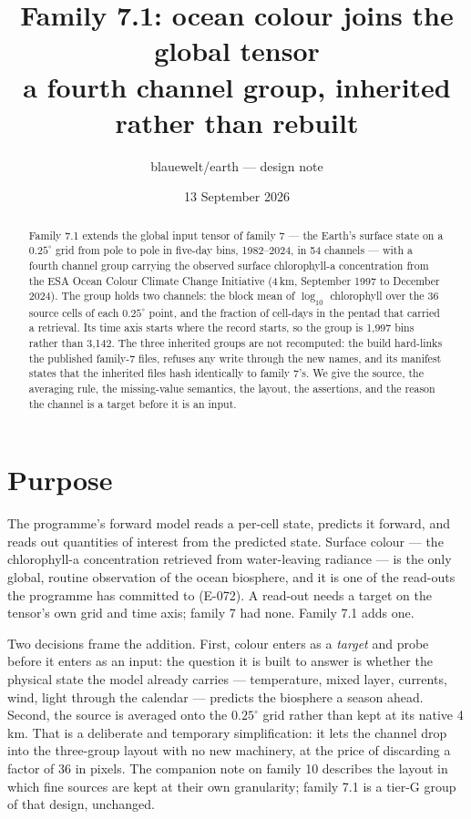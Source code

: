 \documentclass[10pt]{article}
\title{Family 7.1: ocean colour joins the global tensor\\
\large a fourth channel group, inherited rather than rebuilt}
\author{blauewelt/earth --- design note}
\date{13 September 2026}
\begin{document}
\maketitle

\begin{abstract}
Family 7.1 extends the global input tensor of family 7 --- the Earth's
surface state on a $0.25^\circ$ grid from pole to pole in five-day bins,
1982--2024, in 54 channels --- with a fourth channel group carrying the
observed surface chlorophyll-a concentration from the ESA Ocean Colour
Climate Change Initiative (4\,km, September 1997 to December 2024). The
group holds two channels: the block mean of $\log_{10}$ chlorophyll over the
36 source cells of each $0.25^\circ$ point, and the fraction of cell-days in
the pentad that carried a retrieval. Its time axis starts where the record
starts, so the group is 1,997 bins rather than 3,142. The three inherited
groups are not recomputed: the build hard-links the published family-7
files, refuses any write through the new names, and its manifest states that
the inherited files hash identically to family 7's. We give the source, the
averaging rule, the missing-value semantics, the layout, the assertions, and
the reason the channel is a target before it is an input.
\end{abstract}

\section{Purpose}

The programme's forward model reads a per-cell state, predicts it forward,
and reads out quantities of interest from the predicted state. Surface colour
--- the chlorophyll-a concentration retrieved from water-leaving radiance ---
is the only global, routine observation of the ocean biosphere, and it is one
of the read-outs the programme has committed to (E-072). A read-out needs a
target on the tensor's own grid and time axis; family 7 had none. Family 7.1
adds one.

Two decisions frame the addition. First, colour enters as a \emph{target}
and probe before it enters as an input: the question it is built to answer is
whether the physical state the model already carries --- temperature, mixed
layer, currents, wind, light through the calendar --- predicts the biosphere a
season ahead. Second, the source is averaged onto the $0.25^\circ$ grid
rather than kept at its native 4\,km. That is a deliberate and temporary
simplification: it lets the channel drop into the three-group layout with no
new machinery, at the price of discarding a factor of 36 in pixels. The
companion note on family 10 describes the layout in which fine sources are
kept at their own granularity; family 7.1 is a tier-G group of that design,
unchanged.
\end{document}
